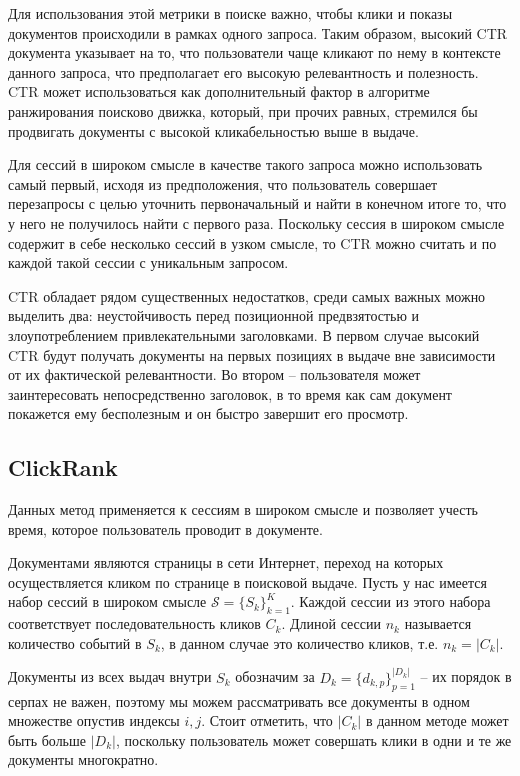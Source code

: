 \documentclass[diploma]{nanolab2015}
\begin{document}
Для использования этой метрики в поиске важно, чтобы клики и показы документов происходили в рамках одного запроса. Таким образом, высокий CTR документа указывает на то, что пользователи чаще кликают по нему в контексте данного запроса, что предполагает его высокую релевантность и полезность. CTR может использоваться как дополнительный фактор в алгоритме ранжирования поисково движка, который, при прочих равных, стремился бы продвигать документы с высокой кликабельностью выше в выдаче.

Для сессий в широком смысле в качестве такого запроса можно использовать самый первый, исходя из предположения, что пользователь совершает перезапросы с целью уточнить первоначальный и найти в конечном итоге то, что у него не получилось найти с первого раза. Поскольку сессия в широком смысле содержит в себе несколько сессий в узком смысле, то CTR можно считать и по каждой такой сессии с уникальным запросом.

CTR обладает рядом существенных недостатков, среди самых важных можно выделить два: неустойчивость перед позиционной предвзятостью и злоупотреблением привлекательными заголовками. В первом случае высокий CTR будут получать документы на первых позициях в выдаче вне зависимости от их фактической релевантности. Во втором -- пользователя может заинтересовать непосредственно заголовок, в то время как сам документ покажется ему бесполезным и он быстро завершит его просмотр.

\subsection{ClickRank}
Данных метод применяется к сессиям в широком смысле и позволяет учесть время, которое пользователь проводит в документе.

Документами являются страницы в сети Интернет, переход на которых осуществляется кликом по странице в поисковой выдаче.
Пусть у нас имеется набор сессий в широком смысле $\mathcal{S} = \{S_k\}_{k=1}^K$. Каждой сессии из этого набора соответствует последовательность кликов $C_k$. Длиной сессии $n_k$ называется количество событий в $S_k$, в данном случае это количество кликов, т.е. $n_k = |C_k|$.

Документы из всех выдач внутри $S_k$ обозначим за $D_k = \{d_{k,p}\}_{p=1}^{|D_k|}$ -- их порядок в серпах не важен, поэтому мы можем рассматривать все документы в одном множестве опустив индексы $i,j$.
Стоит отметить, что $|C_k|$ в данном методе может быть больше $|D_k|$, поскольку пользователь может совершать клики в одни и те же документы многократно.
\end{document}
